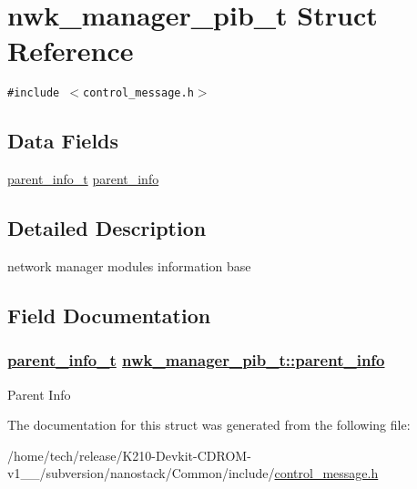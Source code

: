 \hypertarget{structnwk__manager__pib__t}{
\section{nwk\_\-manager\_\-pib\_\-t Struct Reference}
\label{structnwk__manager__pib__t}
}
{\tt \#include $<$control\_\-message.h$>$}

\subsection*{Data Fields}
\begin{CompactItemize}
\item 
\hyperlink{structparent__info__t}{parent\_\-info\_\-t} \hyperlink{structnwk__manager__pib__t_701d4e31cbcddabf0b3036ba477d67ee}{parent\_\-info}
\end{CompactItemize}


\subsection{Detailed Description}
network manager modules information base 



\subsection{Field Documentation}
\hypertarget{structnwk__manager__pib__t_701d4e31cbcddabf0b3036ba477d67ee}{
\subsubsection[parent\_\-info]{\setlength{\rightskip}{0pt plus 5cm}\hyperlink{structparent__info__t}{parent\_\-info\_\-t} \hyperlink{structnwk__manager__pib__t_701d4e31cbcddabf0b3036ba477d67ee}{nwk\_\-manager\_\-pib\_\-t::parent\_\-info}}}
\label{structnwk__manager__pib__t_701d4e31cbcddabf0b3036ba477d67ee}


Parent Info 

The documentation for this struct was generated from the following file:\begin{CompactItemize}
\item 
/home/tech/release/K210-Devkit-CDROM-v1\_\_/subversion/nanostack/Common/include/\hyperlink{control__message_8h}{control\_\-message.h}\end{CompactItemize}
